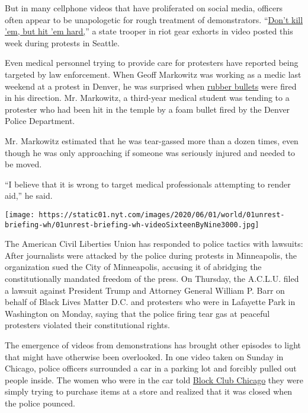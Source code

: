But in many cellphone videos that have proliferated on social media,
officers often appear to be unapologetic for rough treatment of
demonstrators.
``\href{https://twitter.com/Bishop_Krystal/status/1268009974170451968}{Don't
kill 'em, but hit 'em hard,}'' a state trooper in riot gear exhorts in
video posted this week during protests in Seattle.

Even medical personnel trying to provide care for protesters have
reported being targeted by law enforcement. When Geoff Markowitz was
working as a medic last weekend at a protest in Denver, he was surprised
when
\href{https://www.nytimes.com/2020/06/12/health/protests-rubber-bullets-beanbag.html}{rubber
bullets} were fired in his direction. Mr. Markowitz, a third-year
medical student was tending to a protester who had been hit in the
temple by a foam bullet fired by the Denver Police Department.

Mr. Markowitz estimated that he was tear-gassed more than a dozen times,
even though he was only approaching if someone was seriously injured and
needed to be moved.

``I believe that it is wrong to target medical professionals attempting
to render aid,'' he said.

\texttt{[image: https://static01.nyt.com/images/2020/06/01/world/01unrest-briefing-wh/01unrest-briefing-wh-videoSixteenByNine3000.jpg]}

The American Civil Liberties Union has responded to police tactics with
lawsuits: After journalists were attacked by the police during protests
in Minneapolis, the organization sued the City of Minneapolis, accusing
it of abridging the constitutionally mandated freedom of the press. On
Thursday, the A.C.L.U. filed a lawsuit against President Trump and
Attorney General William P. Barr on behalf of Black Lives Matter D.C.
and protesters who were in Lafayette Park in Washington on Monday,
saying that the police firing tear gas at peaceful protesters violated
their constitutional rights.

The emergence of videos from demonstrations has brought other episodes
to light that might have otherwise been overlooked. In one video taken
on Sunday in Chicago, police officers surrounded a car in a parking lot
and forcibly pulled out people inside. The women who were in the car
told
\href{https://blockclubchicago.org/2020/06/04/in-vicious-police-attack-of-black-woman-outside-of-northwest-side-mall-family-demands-criminal-investigation-it-has-to-stop/}{Block
Club Chicago} they were simply trying to purchase items at a store and
realized that it was closed when the police pounced.


